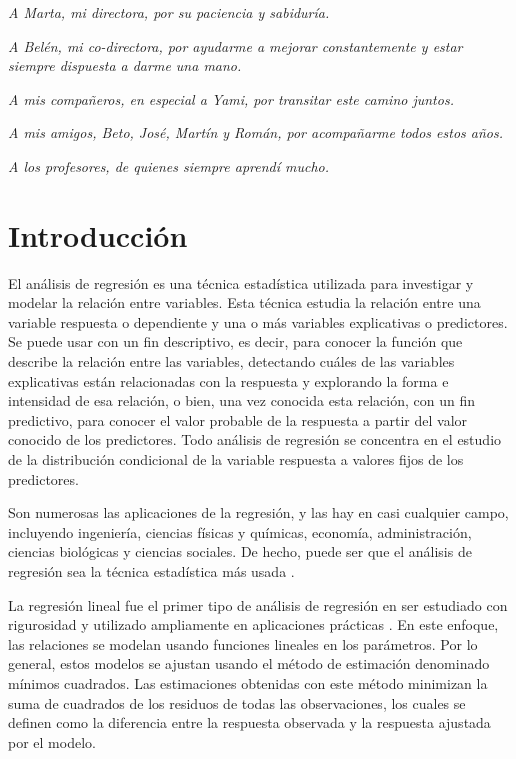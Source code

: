 \documentclass[a4paper,12pt]{report}
\begin{document}
\textit{A Marta, mi directora, por su paciencia y sabiduría.}

\textit{A Belén, mi co-directora, por ayudarme a mejorar constantemente y estar siempre dispuesta a darme una mano.}

\textit{A mis compañeros, en especial a Yami, por transitar este camino juntos.}

\textit{A mis amigos, Beto, José, Martín y Román, por acompañarme todos estos años.}

\textit{A los profesores, de quienes siempre aprendí mucho.}

\clearpage

\pagestyle{empty}
{
  \renewcommand{\thispagestyle}[1]{}
  \tableofcontents
}
\clearpage
\pagestyle{fancy}

\setcounter{page}{1}

\chapter{Introducción}
El análisis de regresión es una técnica estadística utilizada para investigar y modelar la relación entre variables. Esta técnica estudia la relación entre una variable respuesta o dependiente y una o más variables explicativas o predictores. Se puede usar con un fin descriptivo, es decir, para conocer la función que describe la relación entre las variables, detectando cuáles de las variables explicativas están relacionadas con la respuesta y explorando la forma e intensidad de esa relación, o bien, una vez conocida esta relación, con un fin predictivo, para conocer el valor probable de la respuesta a partir del valor conocido de los predictores. Todo análisis de regresión se concentra en el estudio de la distribución condicional de la variable respuesta a valores fijos de los predictores.

Son numerosas las aplicaciones de la regresión, y las hay en casi cualquier campo, incluyendo ingeniería, ciencias físicas y químicas, economía, administración, ciencias biológicas y ciencias sociales. De hecho, puede ser que el análisis de regresión sea la técnica estadística más usada \citep{montgomery2015introduction}.

La regresión lineal fue el primer tipo de análisis de regresión en ser estudiado con rigurosidad y utilizado ampliamente en aplicaciones prácticas \citep{yan2009linear}. En este enfoque, las relaciones se modelan usando funciones lineales en los parámetros. Por lo general, estos modelos se ajustan usando el método de estimación denominado mínimos cuadrados. Las estimaciones obtenidas con este método minimizan la suma de cuadrados de los residuos de todas las observaciones, los cuales se definen como la diferencia entre la respuesta observada y la respuesta ajustada por el modelo.
\end{document}
